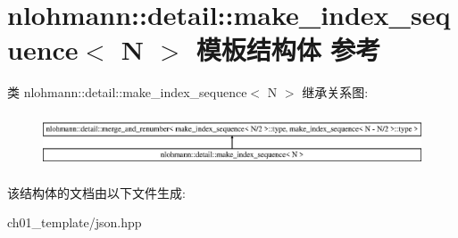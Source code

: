 \hypertarget{structnlohmann_1_1detail_1_1make__index__sequence}{}\section{nlohmann\+::detail\+::make\+\_\+index\+\_\+sequence$<$ N $>$ 模板结构体 参考}
\label{structnlohmann_1_1detail_1_1make__index__sequence}
类 nlohmann\+::detail\+::make\+\_\+index\+\_\+sequence$<$ N $>$ 继承关系图\+:\begin{figure}[H]
\begin{center}
\leavevmode
\includegraphics[height=1.597718cm]{structnlohmann_1_1detail_1_1make__index__sequence}
\end{center}
\end{figure}


该结构体的文档由以下文件生成\+:\begin{DoxyCompactItemize}
\item 
ch01\+\_\+template/json.\+hpp\end{DoxyCompactItemize}
